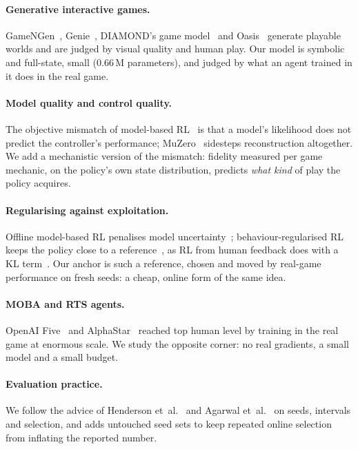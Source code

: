 \documentclass[11pt]{article}
\begin{document}
\paragraph{Generative interactive games.} GameNGen~\cite{valevski2025gamengen}, Genie~\cite{bruce2024genie}, DIAMOND's game model~\cite{alonso2024diamond} and Oasis~\cite{decart2024oasis} generate playable worlds and are judged by visual quality and human play. Our model is symbolic and full-state, small (0.66\,M parameters), and judged by what an agent trained in it does in the real game.

\paragraph{Model quality and control quality.} The objective mismatch of model-based RL~\cite{lambert2020objective} is that a model's likelihood does not predict the controller's performance; MuZero~\cite{schrittwieser2020muzero} sidesteps reconstruction altogether. We add a mechanistic version of the mismatch: fidelity measured per game mechanic, on the policy's own state distribution, predicts \emph{what kind} of play the policy acquires.

\paragraph{Regularising against exploitation.} Offline model-based RL penalises model uncertainty~\cite{yu2020mopo,kidambi2020morel}; behaviour-\allowbreak regularised RL keeps the policy close to a reference~\cite{wu2019brac}, as RL from human feedback does with a KL term~\cite{ouyang2022rlhf}. Our anchor is such a reference, chosen and moved by real-game performance on fresh seeds: a cheap, online form of the same idea.

\paragraph{MOBA and RTS agents.} OpenAI Five~\cite{berner2019dota} and AlphaStar~\cite{vinyals2019alphastar} reached top human level by training in the real game at enormous scale. We study the opposite corner: no real gradients, a small model and a small budget.

\paragraph{Evaluation practice.} We follow the advice of Henderson et~al.~\cite{henderson2018matters} and Agarwal et~al.~\cite{agarwal2021precipice} on seeds, intervals and selection, and adds untouched seed sets to keep repeated online selection from inflating the reported number.
\end{document}
